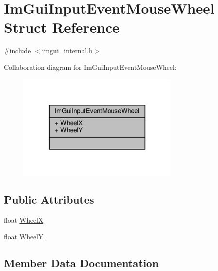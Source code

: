 \hypertarget{structImGuiInputEventMouseWheel}{}\section{Im\+Gui\+Input\+Event\+Mouse\+Wheel Struct Reference}
\label{structImGuiInputEventMouseWheel}


{\ttfamily \#include $<$imgui\+\_\+internal.\+h$>$}



Collaboration diagram for Im\+Gui\+Input\+Event\+Mouse\+Wheel\+:
\nopagebreak
\begin{figure}[H]
\begin{center}
\leavevmode
\includegraphics[width=227pt]{structImGuiInputEventMouseWheel__coll__graph}
\end{center}
\end{figure}
\subsection*{Public Attributes}
\begin{DoxyCompactItemize}
\item 
float \hyperlink{structImGuiInputEventMouseWheel_a73befbdbdd99ebf390a7fb6aa803712b}{WheelX}
\item 
float \hyperlink{structImGuiInputEventMouseWheel_a78146a6a771f9154fc1901d48e819fdb}{WheelY}
\end{DoxyCompactItemize}


\subsection{Member Data Documentation}
\mbox{\label{structImGuiInputEventMouseWheel_a73befbdbdd99ebf390a7fb6aa803712b}} 
